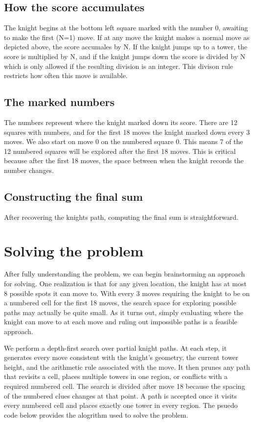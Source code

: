 \documentclass{article}
\begin{document}
\subsection{How the score accumulates}

The knight begins at the bottom left square marked with the number 0, awaiting to make the first (N=1) move. If at any move the knight makes a normal move as depicted above, the score accumales by N. If the knight jumps up to a tower, the score is multiplied by N, and if the knight jumps down the score is divided by N which is only allowed if the resulting division is an integer. This divison rule restricts how often this move is available. 

\subsection{The marked numbers}

The numbers represent where the knight marked down its score. There are 12 squares with numbers, and for the first 18 moves the knight marked down every 3 moves. We also start on move 0 on the numbered square 0. This means 7 of the 12 numbered squares will be explored after the first 18 moves. This is critical because after the first 18 moves, the space between when the knight records the number changes.

\subsection{Constructing the final sum}

After recovering the knights path, computing the final sum is straightforward.

\section{Solving the problem}

After fully understanding the problem, we can begin brainstorming an approach for solving. One realization is that for any given location, the knight has at most 8 possible spots it can move to. With every 3 moves requiring the knight to be on a numbered cell for the first 18 moves, the search space for exploring possible paths may actually be quite small. As it turns out, simply evaluating where the knight can move to at each move and ruling out impossible paths is a feasible approach.

We perform a depth-first search over partial knight paths. At each step, it generates every move consistent with the knight’s geometry, the current tower height, and the arithmetic rule associated with the move. It then prunes any path that revisits a cell, places multiple towers in one region, or conflicts with a required numbered cell. The search is divided after move 18 because the spacing of the numbered clues changes at that point. A path is accepted once it visits every numbered cell and places exactly one tower in every region. The psuedo code below provides the alogrithm used to solve the problem.
\end{document}
